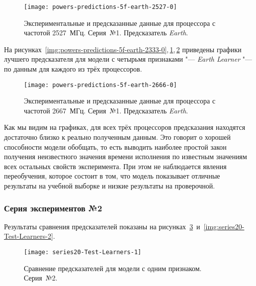 \begin{figure}[H]
    \begin{center}
        \texttt{[image: powers-predictions-5f-earth-2527-0]}
        \caption{Экспериментальные и предсказанные данные для процессора с частотой 2527~МГц. Серия~№1. Предсказатель \textit{Earth}.}
        \label{img:powers-predictions-5f-earth-2527-0}
    \end{center}
\end{figure}

На рисунках~\ref{img:powers-predictions-5f-earth-2333-0},\,\ref{img:powers-predictions-5f-earth-2527-0},\,\ref{img:powers-predictions-5f-earth-2666-0} приведены графики лучшего предсказателя для модели с четырьмя признаками "--- \textit{Earth Learner} "--- по данным для каждого из трёх процессоров.

\begin{figure}[H]
    \begin{center}
        \texttt{[image: powers-predictions-5f-earth-2666-0]}
        \caption{Экспериментальные и предсказанные данные для процессора с частотой 2667~МГц. Серия~№1. Предсказатель \textit{Earth}.}
        \label{img:powers-predictions-5f-earth-2666-0}
    \end{center}
\end{figure}

Как мы видим на графиках, для всех трёх процессоров предсказания находятся достаточно близко к реально полученным данным. Это говорит о хорошей способности модели обобщать, то есть выводить наиболее простой закон получения неизвестного значения времени исполнения по известным значениям всех остальных свойств эксперимента. При этом не наблюдается явления переобучения, которое состоит в том, что модель показывает отличные результаты на учебной выборке и низкие результаты на проверочной.


\subsubsection{Серия экспериментов №2}

Результаты сравнения предсказателей показаны на рисунках~\ref{img:series20-Test-Learners-1}~и~\ref{img:series20-Test-Learners-2}.

\begin{figure}[H]
    \begin{center}
            \texttt{[image: series20-Test-Learners-1]}
            \caption{Сравнение предсказателей для модели с одним признаком. Серия~№2.} %
            \label{img:series20-Test-Learners-1} %
    \end{center}
\end{figure}

